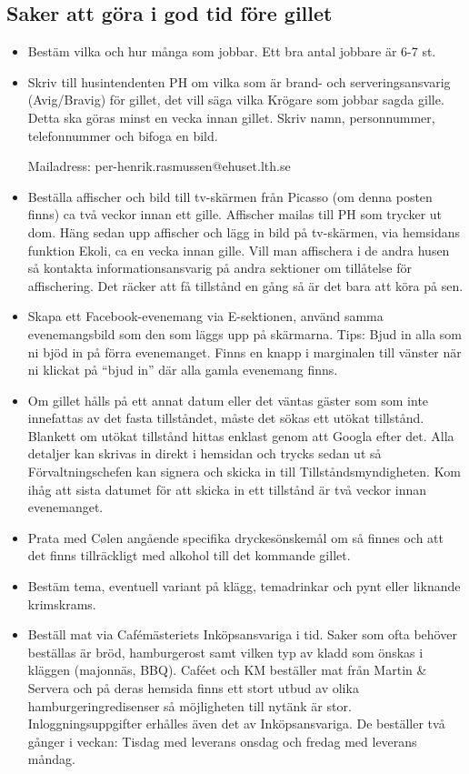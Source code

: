 \documentclass[10pt]{article}
\begin{document}
    \subsection{Saker att göra i god tid före gillet}
    \begin{itemize}
        \item Bestäm vilka och hur många som jobbar. Ett bra antal jobbare är 6-7 st.
        \item Skriv till husintendenten PH om vilka som är brand- och serveringsansvarig (Avig/Bravig) för gillet, det vill säga vilka Krögare som jobbar sagda gille. Detta ska göras minst en vecka innan gillet. Skriv namn, personnummer, telefonnummer och bifoga en bild.

        Mailadress: per-henrik.rasmussen@ehuset.lth.se
        \item Beställa affischer och bild till tv-skärmen från Picasso (om denna posten finns) ca två veckor innan ett gille.
    Affischer mailas till PH som trycker ut dom. Häng sedan upp affischer och lägg in bild på tv-skärmen, via hemsidans funktion Ekoli, ca en vecka innan gille. Vill man affischera i de andra husen så kontakta informationsansvarig på andra sektioner om tillåtelse för affischering. Det räcker att få tillstånd en gång så är det bara att köra på sen.
        \item Skapa ett Facebook-evenemang via E-sektionen, använd samma evenemangsbild som den som läggs upp på skärmarna. Tips: Bjud in alla som ni bjöd in på förra evenemanget. Finns en knapp i marginalen till vänster när ni klickat på “bjud in”
    där alla gamla evenemang finns.
        \item Om gillet hålls på ett annat datum eller det väntas gäster som som inte innefattas av det fasta tillståndet, måste det sökas ett utökat tillstånd. Blankett om utökat tillstånd hittas enklast genom att Googla efter det. Alla detaljer kan skrivas in direkt i hemsidan och trycks sedan ut så Förvaltningschefen kan signera och skicka in till Tillståndsmyndigheten. Kom ihåg att sista datumet för att skicka in ett tillstånd är två veckor innan evenemanget.
        \item Prata med Cølen angående specifika dryckesönskemål om så finnes och att det finns tillräckligt med alkohol till det kommande gillet.
        \item Bestäm tema, eventuell variant på klägg, temadrinkar och pynt eller liknande krimskrams.
        \item Beställ mat via Cafémästeriets Inköpsansvariga i tid. Saker som ofta behöver beställas är bröd, hamburgerost samt vilken typ av kladd som önskas i kläggen (majonnäs, BBQ). Caféet och KM beställer mat från Martin \& Servera och på deras hemsida finns ett stort utbud av olika hamburgeringredisenser så möjligheten till nytänk är stor. Inloggningsuppgifter erhålles även det av Inköpsansvariga. De beställer två gånger i veckan: Tisdag med leverans onsdag och fredag med leverans måndag.

\end{itemize}
\end{document}
